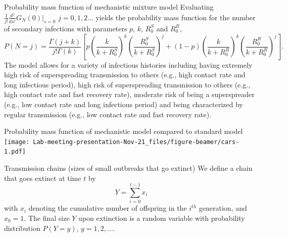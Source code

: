 \documentclass[
  ignorenonframetext,
]{beamer}
\begin{document}
\begin{frame}{Probability mass function of mechanistic mixture model}
\protect\hypertarget{probability-mass-function-of-mechanistic-mixture-model}{}
Evaluating \(\frac{1}{j!} \frac{d^j}{ds^j} G_N(0) |_{s=0}\)
\(j=0,1,2\dots\) yields the probability mass function for the number of
secondary infections with parameters \(p\), \(k\), \(R_0^S\) and
\(R_0^R\), \scriptsize \begin{equation*}\label{eqn:nbinommixpmf}
    P(N=j) =  \frac{\Gamma(j+k)}{j! \Gamma (k)} \left [ p \left(\frac{k}{k+R_0^S} \right)^{k}\left (\frac{R_0^S}{k+R_0^S} \right )^j+ (1-p) \left(\frac{k}{k+R_0^R} \right)^{k}\left (\frac{R_0^R}{k+R_0^R} \right )^j \right ].
\end{equation*} \normalsize The model allows for a variety of infectious
histories including having extremely high risk of superspreading
transmission to others (e.g., high contact rate and long infectious
period), high risk of superspreading transmission to others (e.g., high
contact rate and fast recovery rate), moderate risk of being a
superspreader (e.g., low contact rate and long infectious period) and
being characterized by regular transmission (e.g., low contact rate and
fast recovery rate).
\end{frame}

\begin{frame}{Probability mass function of mechanistic model compared to
standard model}
\protect\hypertarget{probability-mass-function-of-mechanistic-model-compared-to-standard-model}{}
\texttt{[image: Lab-meeting-presentation-Nov-21\_files/figure-beamer/cars-1.pdf]}
\end{frame}

\begin{frame}{Transmission chains (sizes of small outbreaks that go
extinct)}
\protect\hypertarget{transmission-chains-sizes-of-small-outbreaks-that-go-extinct}{}
We define a chain that goes extinct at time \(t\) by \[
Y = \sum_{i=0}^{t-1}x_i
\] with \(x_i\) denoting the cumulative number of offspring in the
\(i^{th}\) generation, and \(x_0 = 1\). The final size \(Y\) upon
extinction is a random variable with probability distribution
\(P(Y=y)\), \(y=1,2,...\).
\end{frame}
\end{document}
